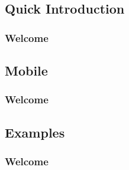 \documentclass[12pt,presentation]{beamer}
\begin{document}
\subsection{Quick Introduction}

\begin{frame}
	\frametitle{Welcome}

\end{frame}

\subsection{Mobile}

\begin{frame}
	\frametitle{Welcome}

\end{frame}

\subsection{Examples}

\begin{frame}
	\frametitle{Welcome}

\end{frame}
\end{document}
